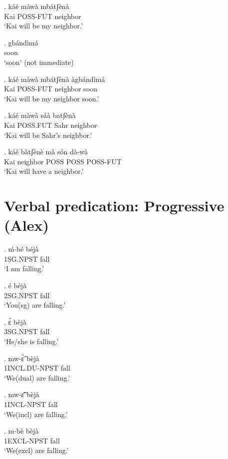 \documentclass{assets/fieldnotes}
\begin{document}
{\exg. káé màwà mbátʃènà \\
Kai POSS-FUT neighbor \\
`Kai will be my neighbor.'

\exg. gbándìmá \\
soon\\
`soon' (not immediate)

\exg. káé màwà mbátʃènà àgbándìmá\\
Kai POSS-FUT neighbor soon \\
`Kai will be my neighbor soon.'


\exg. káé màwà sáà batʃènà \\
Kai POSS.FUT Sahr neighbor \\
`Kai will be Sahr's neighbor.'

\exg. káé bàtʃènè mà són dà-wà \\
Kai neighbor POSS POSS POSS-FUT \\
`Kai will have a neighbor.'


\section{Verbal predication: Progressive (Alex)} %

\exg.
ḿ-bé        béjà \\
1SG.NPST   fall \\%
`I am falling.'

\exg.
é         béjà \\
2SG.NPST   fall \\%
`You(sg) are falling.'

\exg.
ɛ̀         bèjà \\
3SG.NPST   fall \\%
`He/she is falling.'

\exg.
mw-ɛ̃̀    bèjà \\
1INCL.DU-NPST   fall \\%
`We(dual) are falling.'

\exg.
mw-ɛ̃̂         bèjà \\
1INCL-NPST  fall \\%
`We(incl) are falling.'

\exg.
m-bè         bèjà \\
1EXCL-NPST   fall \\%
`We(excl) are falling.' \label{We(excl) are falling}

}
\end{document}
